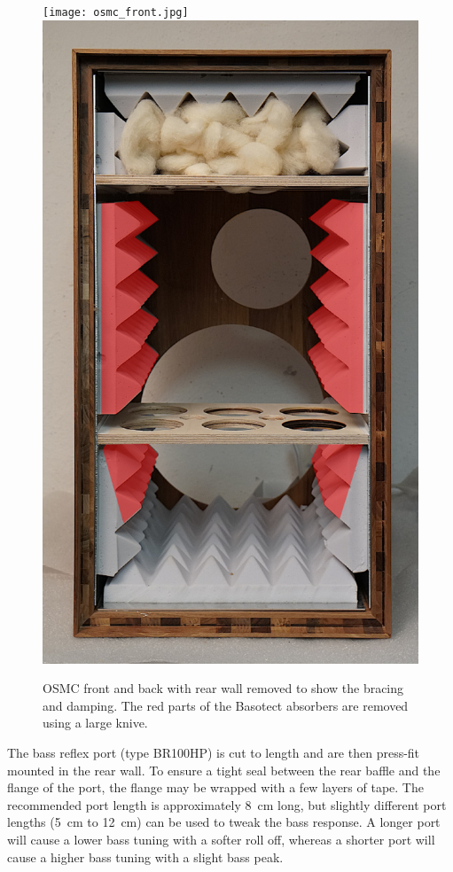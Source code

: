 \documentclass[12pt,a4paper]{article}
\providecommand{\figlabel}[1]{\label{fig:#1}}
\begin{document}
\begin{figure}[tbp]
	\centering
	\texttt{[image: osmc\_front.jpg]}
	\hfill
	\includegraphics[height=0.55\textheight]{osmc_cabinet_open_damping.pdf}
	\caption{OSMC front and back with rear wall removed to show the bracing and damping. The red parts of the Basotect absorbers are removed using a large knive.}
	\figlabel{osmc_photos}
\end{figure}

The bass reflex port (type BR100HP) is cut to length and are then press-fit mounted in the rear wall. To ensure a tight seal between the rear baffle and the flange of the port, the flange may be wrapped with a few layers of tape. The recommended port length is approximately \SI{8}{cm} long, but slightly different port lengths (\SI{5}{cm} to \SI{12}{cm}) can be used to tweak the bass response. A longer port will cause a lower bass tuning with a softer roll off, whereas a shorter port will cause a higher bass tuning with a slight bass peak.
\end{document}
